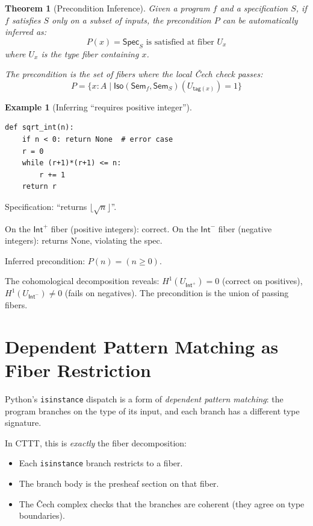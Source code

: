 \documentclass[11pt,a4paper]{report}
\theoremstyle{definition}
\newtheorem{example}[definition]{Example}
\theoremstyle{plain}
\newtheorem{theorem}[definition]{Theorem}
\newcommand{\Sem}{\mathsf{Sem}}
\newcommand{\Iso}{\mathsf{Iso}}
\newcommand{\Hone}{H^1}
\begin{document}
\begin{theorem}[Precondition Inference]
\label{thm:precondition}
Given a program $f$ and a specification $S$, if $f$ satisfies $S$
only on a subset of inputs, the \emph{precondition} $P$ can be
automatically inferred as:
\[
  P(x) = \mathsf{Spec}_S \text{ is satisfied at fiber } U_x
\]
where $U_x$ is the type fiber containing $x$.

The precondition is the set of fibers where the local \v{C}ech check
passes:
\[
  P = \{x : A \mid \Iso(\Sem_f, \Sem_S)(U_{\mathsf{tag}(x)}) = 1\}
\]
\end{theorem}

\begin{example}[Inferring ``requires positive integer'']
\begin{lstlisting}
def sqrt_int(n):
    if n < 0: return None  # error case
    r = 0
    while (r+1)*(r+1) <= n:
        r += 1
    return r
\end{lstlisting}

Specification: ``returns $\lfloor\sqrt{n}\rfloor$''.

On the $\mathsf{Int}^+$ fiber (positive integers): correct.
On the $\mathsf{Int}^-$ fiber (negative integers): returns None,
violating the spec.

Inferred precondition: $P(n) = (n \geq 0)$.

The cohomological decomposition reveals: $\Hone(U_{\mathsf{Int}^+}) = 0$
(correct on positives), $\Hone(U_{\mathsf{Int}^-}) \neq 0$
(fails on negatives).  The precondition is the union of passing fibers.
\end{example}

\section{Dependent Pattern Matching as Fiber Restriction}

Python's \texttt{isinstance} dispatch is a form of \emph{dependent
pattern matching}: the program branches on the type of its input,
and each branch has a different type signature.

In CTTT, this is \emph{exactly} the fiber decomposition:
\begin{itemize}
  \item Each \texttt{isinstance} branch restricts to a fiber.
  \item The branch body is the presheaf section on that fiber.
  \item The \v{C}ech complex checks that the branches are coherent
    (they agree on type boundaries).
\end{itemize}
\end{document}
